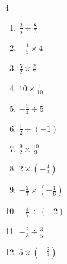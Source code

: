 \begin{multicols}{4}
\begin{enumerate}

  \item $\displaystyle \frac{2}{5}\div{}\frac{8}{3}$


  \item $\displaystyle -\frac{1}{5}\times{}4$


  \item $\displaystyle \frac{5}{2}\times{}\frac{2}{7}$


  \item $\displaystyle 10\times{}\frac{1}{10}$

        \phantom{$\displaystyle =1$}

\columnbreak %

  \item $\displaystyle -\frac{5}{4}\div{}5$


  \item $\displaystyle \frac{1}{2}\div{}\left(-1\right)$


  \item $\displaystyle \frac{9}{2}\times{}\frac{10}{9}$

        \phantom{$\displaystyle =5$}

  \item $\displaystyle 2\times{}\left(-\frac{4}{3}\right)$


  \item $\displaystyle -\frac{2}{7}\times{}\left(-\frac{1}{6}\right)$


  \item $\displaystyle -\frac{4}{7}\div{}\left(-2\right)$


  \item $\displaystyle -\frac{2}{3}\div{}\frac{3}{5}$


  \item $\displaystyle 5\times{}\left(-\frac{2}{3}\right)$


\end{enumerate}
\end{multicols}
